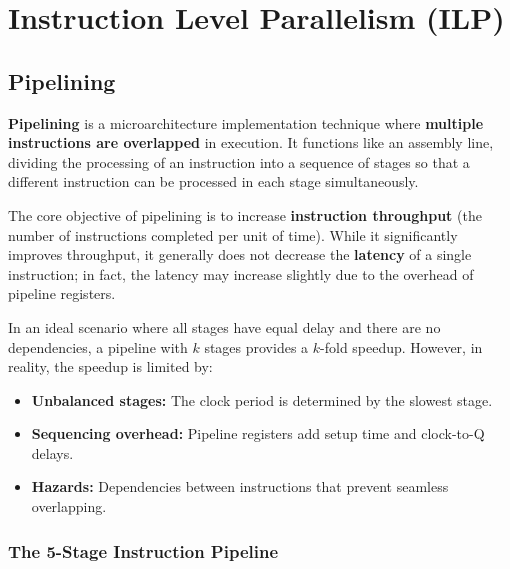 \section{Instruction Level Parallelism (ILP)}

\subsection{Pipelining}

\begin{definition}
	\textbf{Pipelining} is a microarchitecture implementation technique where \textbf{multiple instructions are overlapped} in execution. It functions like an assembly line, dividing the processing of an instruction into a sequence of stages so that a different instruction can be processed in each stage simultaneously.
\end{definition}

\begin{important}
	The core objective of pipelining is to increase \textbf{instruction throughput} (the number of instructions completed per unit of time). While it significantly improves throughput, it generally does not decrease the \textbf{latency} of a single instruction; in fact, the latency may increase slightly due to the overhead of pipeline registers.
\end{important}

\begin{theorem}
	In an ideal scenario where all stages have equal delay and there are no dependencies, a pipeline with $k$ stages provides a $k$-fold speedup. However, in reality, the speedup is limited by:
	\begin{itemize}
		\item \textbf{Unbalanced stages:} The clock period is determined by the slowest stage.
		\item \textbf{Sequencing overhead:} Pipeline registers add setup time and clock-to-Q delays.
		\item \textbf{Hazards:} Dependencies between instructions that prevent seamless overlapping.
	\end{itemize}
\end{theorem}



\subsubsection{The 5-Stage Instruction Pipeline}


